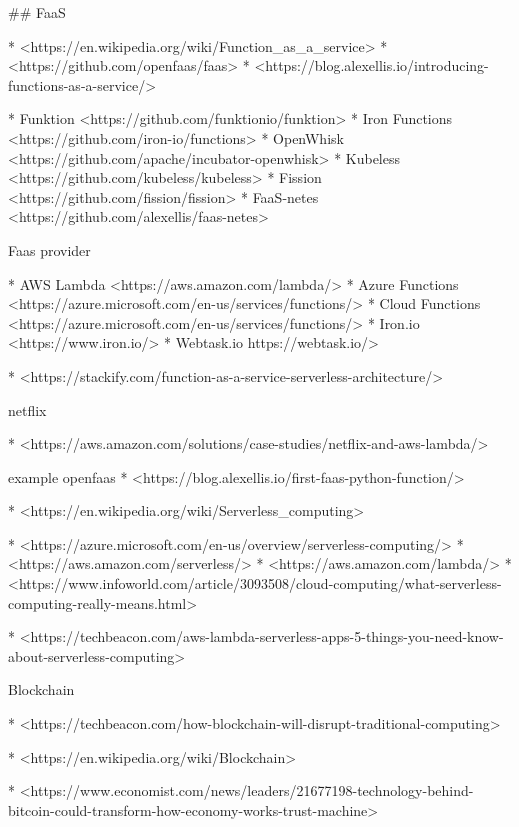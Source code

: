 ## FaaS 



* <https://en.wikipedia.org/wiki/Function_as_a_service>
* <https://github.com/openfaas/faas>
* <https://blog.alexellis.io/introducing-functions-as-a-service/>

* Funktion  <https://github.com/funktionio/funktion>
* Iron Functions <https://github.com/iron-io/functions>
* OpenWhisk <https://github.com/apache/incubator-openwhisk>
* Kubeless <https://github.com/kubeless/kubeless>
* Fission <https://github.com/fission/fission>
* FaaS-netes <https://github.com/alexellis/faas-netes>

Faas provider

* AWS Lambda <https://aws.amazon.com/lambda/>
* Azure Functions <https://azure.microsoft.com/en-us/services/functions/>
* Cloud Functions <https://azure.microsoft.com/en-us/services/functions/>
* Iron.io <https://www.iron.io/>
* Webtask.io https://webtask.io/>



* <https://stackify.com/function-as-a-service-serverless-architecture/>

netflix

* <https://aws.amazon.com/solutions/case-studies/netflix-and-aws-lambda/>


example openfaas
* <https://blog.alexellis.io/first-faas-python-function/>

* <https://en.wikipedia.org/wiki/Serverless_computing>


* <https://azure.microsoft.com/en-us/overview/serverless-computing/>
* <https://aws.amazon.com/serverless/>
* <https://aws.amazon.com/lambda/>
* <https://www.infoworld.com/article/3093508/cloud-computing/what-serverless-computing-really-means.html>

* <https://techbeacon.com/aws-lambda-serverless-apps-5-things-you-need-know-about-serverless-computing>


Blockchain

* <https://techbeacon.com/how-blockchain-will-disrupt-traditional-computing>

* <https://en.wikipedia.org/wiki/Blockchain>

* <https://www.economist.com/news/leaders/21677198-technology-behind-bitcoin-could-transform-how-economy-works-trust-machine>